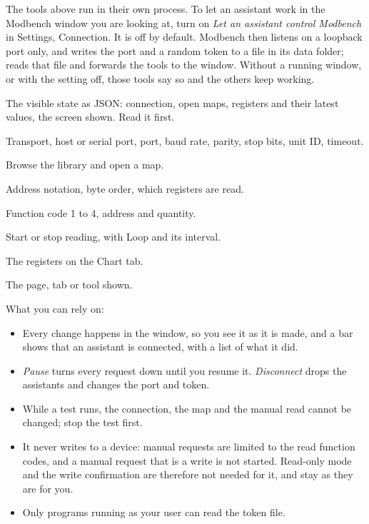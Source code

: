 The tools above run in their own process. To let an assistant work in the
Modbench window you are looking at, turn on \emph{Let an assistant control
Modbench} in Settings, Connection. It is off by default. Modbench then listens
on a loopback port only, and writes the port and a random token to a file in
its data folder;  reads that file and forwards the
 tools to the window. Without a running window, or with the setting
off, those tools say so and the others keep working.

\begin{description}[style=nextline, leftmargin=0pt, font=\intermedium]
  \item[gui\_get\_state] The visible state as JSON: connection, open maps,
    registers and their latest values, the screen shown. Read it first.
  \item[gui\_set\_connection] Transport, host or serial port, port, baud rate,
    parity, stop bits, unit ID, timeout.
  \item[gui\_list\_library, gui\_open\_map] Browse the library and open a map.
  \item[gui\_set\_map\_view] Address notation, byte order, which registers are
    read.
  \item[gui\_set\_manual\_read] Function code 1 to 4, address and quantity.
  \item[gui\_run] Start or stop reading, with Loop and its interval.
  \item[gui\_chart] The registers on the Chart tab.
  \item[gui\_navigate] The page, tab or tool shown.
\end{description}

What you can rely on:
\begin{itemize}
  \item Every change happens in the window, so you see it as it is made, and
    a bar shows that an assistant is connected, with a list of what it did.
  \item \emph{Pause} turns every request down until you resume it.
    \emph{Disconnect} drops the assistants and changes the port and token.
  \item While a test runs, the connection, the map and the manual read cannot
    be changed; stop the test first.
  \item It never writes to a device: manual requests are limited to the read
    function codes, and a manual request that is a write is not started.
    Read-only mode and the write confirmation are therefore not needed for it,
    and stay as they are for you.
  \item Only programs running as your user can read the token file.
\end{itemize}
